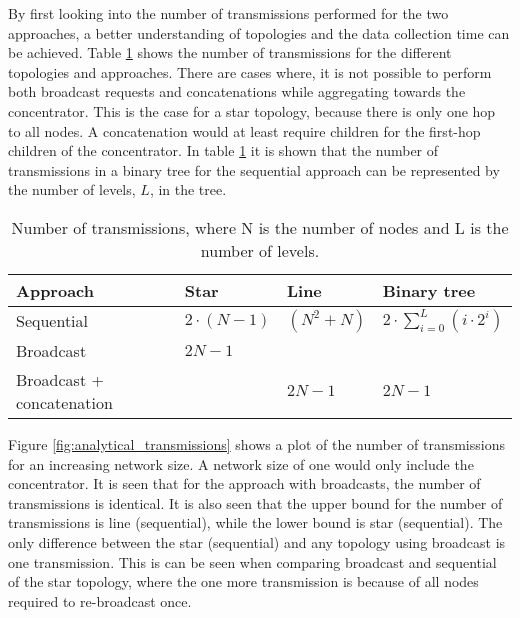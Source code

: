 
By first looking into the number of transmissions performed for the two approaches, a better understanding of topologies and the data collection time can be achieved. Table \ref{tab:bounds_trans} shows the number of transmissions for the different topologies and approaches. There are cases where, it is not possible to perform both broadcast requests and concatenations while aggregating towards the concentrator. This is the case for a star topology, because there is only one hop to all nodes. A concatenation would at least require children for the first-hop children of the concentrator. In table \ref{tab:bounds_trans} it is shown that the number of transmissions in a binary tree for the sequential approach can be represented by the number of levels, $L$, in the tree.

\begin{table}[H]
	\centering
    \begin{tabular}{|l|l|l|l|}
    \hline
    Approach                  & Star           & Line        & Binary tree      \\ \hline
    Sequential                & $2{\cdot}(N-1)$    & $(N^2+N)$ & $2{\cdot}\sum\limits_{i=0}^L(i{\cdot}2^i)$ \\ \hline
    Broadcast                 & $2N-1$ & ~           & ~                \\ \hline
    Broadcast + concatenation & ~              & $2N-1$    & $2N-1$ \\ \hline
    \end{tabular}
    \caption{Number of transmissions, where N is the number of nodes and L is the number of levels.}
    \label{tab:bounds_trans}
\end{table}

Figure \ref{fig:analytical_transmissions} shows a plot of the number of transmissions for an increasing network size. A network size of one would only include the concentrator. It is seen that for the approach with broadcasts, the number of transmissions is identical. It is also seen that the upper bound for the number of transmissions is line (sequential), while the lower bound is star (sequential). The only difference between the star (sequential) and any topology using broadcast is one transmission. This is can be seen when comparing broadcast and sequential of the star topology, where the one more transmission is because of all nodes required to re-broadcast once.

